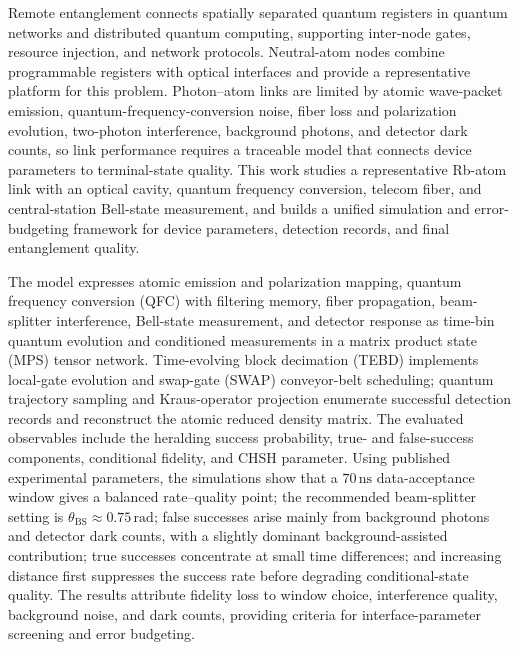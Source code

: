 \begin{eabstract}
Remote entanglement connects spatially separated quantum registers in quantum networks and distributed quantum computing, supporting inter-node gates, resource injection, and network protocols. Neutral-atom nodes combine programmable registers with optical interfaces and provide a representative platform for this problem. Photon--atom links are limited by atomic wave-packet emission, quantum-frequency-conversion noise, fiber loss and polarization evolution, two-photon interference, background photons, and detector dark counts, so link performance requires a traceable model that connects device parameters to terminal-state quality. This work studies a representative Rb-atom link with an optical cavity, quantum frequency conversion, telecom fiber, and central-station Bell-state measurement, and builds a unified simulation and error-budgeting framework for device parameters, detection records, and final entanglement quality.

The model expresses atomic emission and polarization mapping, quantum frequency conversion (QFC) with filtering memory, fiber propagation, beam-splitter interference, Bell-state measurement, and detector response as time-bin quantum evolution and conditioned measurements in a matrix product state (MPS) tensor network. Time-evolving block decimation (TEBD) implements local-gate evolution and swap-gate (SWAP) conveyor-belt scheduling; quantum trajectory sampling and Kraus-operator projection enumerate successful detection records and reconstruct the atomic reduced density matrix. The evaluated observables include the heralding success probability, true- and false-success components, conditional fidelity, and CHSH parameter. Using published experimental parameters, the simulations show that a $70\,\mathrm{ns}$ data-acceptance window gives a balanced rate--quality point; the recommended beam-splitter setting is $\theta_{\mathrm{BS}}\approx0.75\,\mathrm{rad}$; false successes arise mainly from background photons and detector dark counts, with a slightly dominant background-assisted contribution; true successes concentrate at small time differences; and increasing distance first suppresses the success rate before degrading conditional-state quality. The results attribute fidelity loss to window choice, interference quality, background noise, and dark counts, providing criteria for interface-parameter screening and error budgeting.
\end{eabstract}

